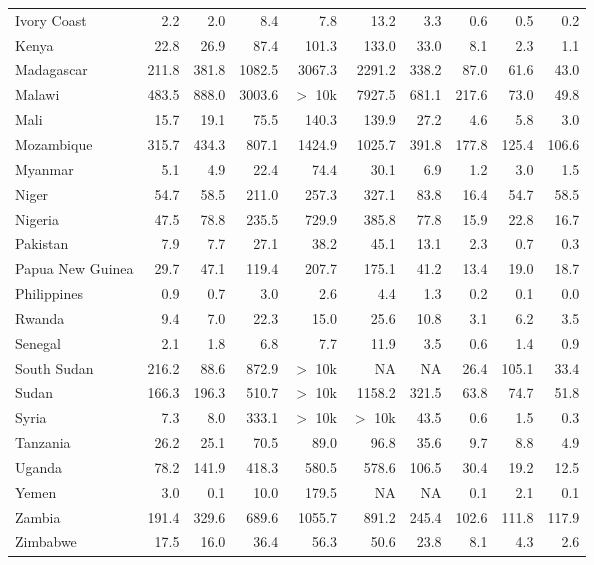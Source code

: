 \begin{table}[h]
{\begin{tabular}[t]{lrrrrrrrrr}
Ivory Coast & 2.2 & 2.0 & 8.4 & 7.8 & 13.2 & 3.3 & 0.6 & 0.5 & 0.2\\
Kenya & 22.8 & 26.9 & 87.4 & 101.3 & 133.0 & 33.0 & 8.1 & 2.3 & 1.1\\
Madagascar & 211.8 & 381.8 & 1082.5 & 3067.3 & 2291.2 & 338.2 & 87.0 & 61.6 & 43.0\\
Malawi & 483.5 & 888.0 & 3003.6 & $>$ 10k & 7927.5 & 681.1 & 217.6 & 73.0 & 49.8\\
Mali & 15.7 & 19.1 & 75.5 & 140.3 & 139.9 & 27.2 & 4.6 & 5.8 & 3.0\\
Mozambique & 315.7 & 434.3 & 807.1 & 1424.9 & 1025.7 & 391.8 & 177.8 & 125.4 & 106.6\\
Myanmar & 5.1 & 4.9 & 22.4 & 74.4 & 30.1 & 6.9 & 1.2 & 3.0 & 1.5\\
Niger & 54.7 & 58.5 & 211.0 & 257.3 & 327.1 & 83.8 & 16.4 & 54.7 & 58.5\\
Nigeria & 47.5 & 78.8 & 235.5 & 729.9 & 385.8 & 77.8 & 15.9 & 22.8 & 16.7\\
Pakistan & 7.9 & 7.7 & 27.1 & 38.2 & 45.1 & 13.1 & 2.3 & 0.7 & 0.3\\
Papua New Guinea & 29.7 & 47.1 & 119.4 & 207.7 & 175.1 & 41.2 & 13.4 & 19.0 & 18.7\\
Philippines & 0.9 & 0.7 & 3.0 & 2.6 & 4.4 & 1.3 & 0.2 & 0.1 & 0.0\\
Rwanda & 9.4 & 7.0 & 22.3 & 15.0 & 25.6 & 10.8 & 3.1 & 6.2 & 3.5\\
Senegal & 2.1 & 1.8 & 6.8 & 7.7 & 11.9 & 3.5 & 0.6 & 1.4 & 0.9\\
South Sudan & 216.2 & 88.6 & 872.9 & $>$ 10k & NA & NA & 26.4 & 105.1 & 33.4\\
Sudan & 166.3 & 196.3 & 510.7 & $>$ 10k & 1158.2 & 321.5 & 63.8 & 74.7 & 51.8\\
Syria & 7.3 & 8.0 & 333.1 & $>$ 10k & $>$ 10k & 43.5 & 0.6 & 1.5 & 0.3\\
Tanzania & 26.2 & 25.1 & 70.5 & 89.0 & 96.8 & 35.6 & 9.7 & 8.8 & 4.9\\
Uganda & 78.2 & 141.9 & 418.3 & 580.5 & 578.6 & 106.5 & 30.4 & 19.2 & 12.5\\
Yemen & 3.0 & 0.1 & 10.0 & 179.5 & NA & NA & 0.1 & 2.1 & 0.1\\
Zambia & 191.4 & 329.6 & 689.6 & 1055.7 & 891.2 & 245.4 & 102.6 & 111.8 & 117.9\\
Zimbabwe & 17.5 & 16.0 & 36.4 & 56.3 & 50.6 & 23.8 & 8.1 & 4.3 & 2.6\\
\bottomrule
\end{tabular}}
\end{table}